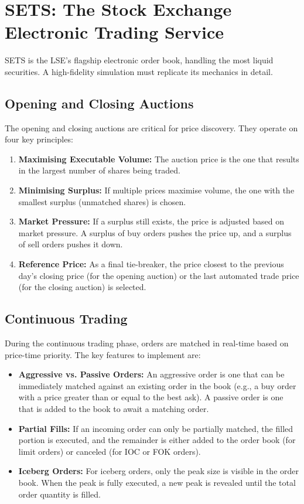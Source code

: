 \documentclass[12pt]{article}
\begin{document}
\section{SETS: The Stock Exchange Electronic Trading Service}

SETS is the LSE's flagship electronic order book, handling the most liquid securities. A high-fidelity simulation must replicate its mechanics in detail.

\subsection{Opening and Closing Auctions}

The opening and closing auctions are critical for price discovery. They operate on four key principles:

\begin{enumerate}
    \item \textbf{Maximising Executable Volume:} The auction price is the one that results in the largest number of shares being traded.
    \item \textbf{Minimising Surplus:} If multiple prices maximise volume, the one with the smallest surplus (unmatched shares) is chosen.
    \item \textbf{Market Pressure:} If a surplus still exists, the price is adjusted based on market pressure. A surplus of buy orders pushes the price up, and a surplus of sell orders pushes it down.
    \item \textbf{Reference Price:} As a final tie-breaker, the price closest to the previous day's closing price (for the opening auction) or the last automated trade price (for the closing auction) is selected.
\end{enumerate}

\subsection{Continuous Trading}

During the continuous trading phase, orders are matched in real-time based on price-time priority. The key features to implement are:

\begin{itemize}
    \item \textbf{Aggressive vs. Passive Orders:} An aggressive order is one that can be immediately matched against an existing order in the book (e.g., a buy order with a price greater than or equal to the best ask). A passive order is one that is added to the book to await a matching order.
    \item \textbf{Partial Fills:} If an incoming order can only be partially matched, the filled portion is executed, and the remainder is either added to the order book (for limit orders) or canceled (for IOC or FOK orders).
    \item \textbf{Iceberg Orders:} For iceberg orders, only the peak size is visible in the order book. When the peak is fully executed, a new peak is revealed until the total order quantity is filled.
\end{itemize}
\end{document}
